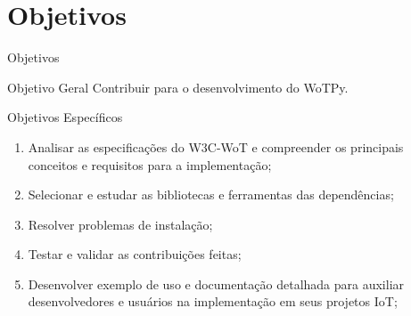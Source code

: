 \section{Objetivos}

\begin{frame}{Objetivos}

    \begin{block}{Objetivo Geral}
        Contribuir para o desenvolvimento do WoTPy.
    \end{block}

    \begin{block}{Objetivos Específicos}
        \begin{enumerate}
            \item Analisar as especificações do W3C-WoT e compreender os principais conceitos e requisitos para a implementação;
            \item Selecionar e estudar as bibliotecas e ferramentas das dependências;
            \item Resolver problemas de instalação;
            \item Testar e validar as contribuições feitas;
            \item Desenvolver exemplo de uso e documentação detalhada para auxiliar desenvolvedores e usuários na implementação em seus projetos IoT;
        \end{enumerate}
    \end{block}

\end{frame}